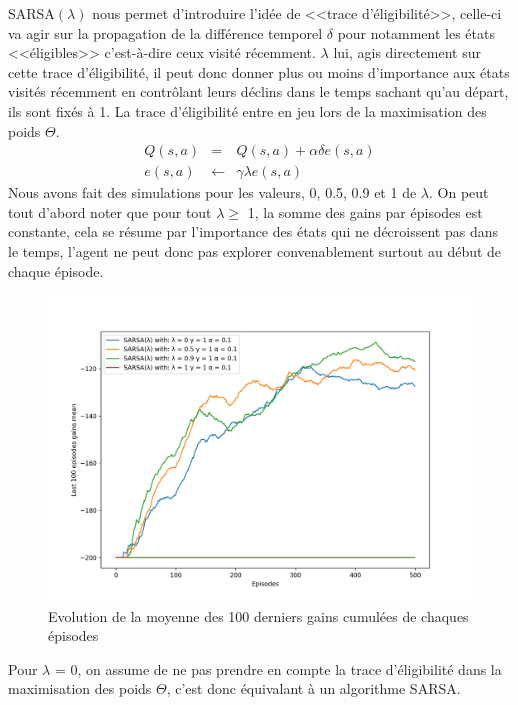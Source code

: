 \documentclass[letterpaper,11pt]{article}
\begin{document}
\begin{enumerate}[label=(\alph*)]
SARSA$(\lambda)$ nous permet d'introduire l'idée de <<trace d'éligibilité>>, celle-ci va agir sur la propagation de la différence temporel $\delta$ pour notamment les états <<éligibles>> c'est-à-dire ceux visité récemment.
$\lambda$ lui, agis directement sur cette trace d'éligibilité, il peut donc donner plus ou moins d'importance aux états visités récemment en contrôlant leurs déclins dans le temps sachant qu'au départ, ils sont fixés à 1.
La trace d'éligibilité entre en jeu lors de la maximisation des poids $\Theta$.
\begin{eqnarray*}
Q(s,a) & = & Q(s,a) + \alpha \delta e(s,a) \\
e(s,a) & \leftarrow &  \gamma \lambda e(s,a)
\end{eqnarray*}
Nous avons fait des simulations pour les valeurs, 0, 0.5, 0.9 et 1 de $\lambda$. On peut tout d'abord noter que pour tout $\lambda \geq$ 1, la somme des gains par épisodes est constante, cela se résume par l'importance des états qui ne décroissent pas dans le temps, l'agent ne peut donc pas explorer convenablement surtout au début de chaque épisode.
\begin{figure}[H]
\label{figure: variance petite}
\caption{Evolution de la moyenne des 100 derniers gains cumulées de chaques épisodes }
\begin{center}
\includegraphics[scale=0.3]{SARSA_lambda_gains.png}
\end{center}
\end{figure}
Pour $\lambda$ = 0, on assume de ne pas prendre en compte la trace d'éligibilité dans la maximisation des poids $\Theta$, c'est donc équivalant à un algorithme SARSA.


\end{enumerate}
\end{document}

